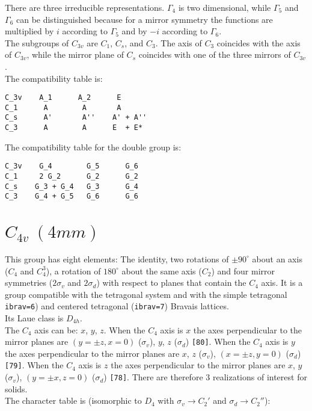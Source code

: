 \documentclass[12pt,a4paper,twoside]{report}
\begin{document}
There are three irreducible representations. $\Gamma_4$ is two dimensional, while
$\Gamma_5$ and $\Gamma_6$ can be distinguished because for a mirror symmetry the
functions are multiplied by $i$ according to $\Gamma_5$ and by $-i$ according to
$\Gamma_6$. \\
The subgroups of $C_{3v}$ are $C_1$, $C_s$, and $C_3$. The axis of $C_3$ coincides
with the axis of $C_{3v}$, while the mirror plane of $C_s$ coincides with
one of the three mirrors of $C_{3v}$. \\
The compatibility table is:

\begin{tcolorbox}
\begin{footnotesize}
\begin{verbatim}
C_3v    A_1      A_2      E
C_1      A        A       A
C_s      A'       A''    A' + A''
C_3      A        A      E  + E*
\end{verbatim}
\end{footnotesize}
\end{tcolorbox}

The compatibility table for the double group is:

\begin{tcolorbox}
\begin{footnotesize}
\begin{verbatim}
C_3v    G_4        G_5      G_6
C_1     2 G_2      G_2      G_2
C_s    G_3 + G_4   G_3      G_4
C_3    G_4 + G_5   G_6      G_6
\end{verbatim}
\end{footnotesize}
\end{tcolorbox}


\newpage
{\color{coral}\section{$C_{4v}\ (4mm)$}} 
\color{black}
This group has eight elements: The identity, two rotations of $\pm90^\circ$ 
about an axis ($C_4$ and $C_4^3$), a rotation of $180^\circ$ about the same axis 
($C_2$) and four mirror symmetries ($2\sigma_v$ and $2 \sigma_d$) with respect
to planes that contain the $C_4$ axis.
It is a group compatible with the tetragonal system and with the  
simple tetragonal \texttt{ibrav=6}) and centered tetragonal (\texttt{ibrav=7}) 
Bravais lattices. \\ 
Its Laue class is $D_{4h}$. \\
The $C_4$ axis can be: $x$, $y$, $z$. When the $C_4$ axis is $x$ the axes
perpendicular to the mirror planes are $(y=\pm z, x=0)$ ($\sigma_v$), 
$y$, $z$ ($\sigma_d$) \texttt{[80]}. When the $C_4$ axis is $y$
the axes perpendicular to the mirror planes are $x$, $z$ ($\sigma_v$),
$(x=\pm z, y=0)$ ($\sigma_d$) \texttt{[79]}. When the 
$C_4$ axis is $z$ the axes perpendicular to the mirror planes are $x$, $y$
($\sigma_v$), $(y=\pm x, z=0)$ ($\sigma_d$) \texttt{[78]}.
There are therefore $3$ realizations of interest for solids. \\
The character table is (isomorphic to $D_4$ with $\sigma_v \rightarrow C_2'$
and $\sigma_d \rightarrow C_2''$):
\end{document}
